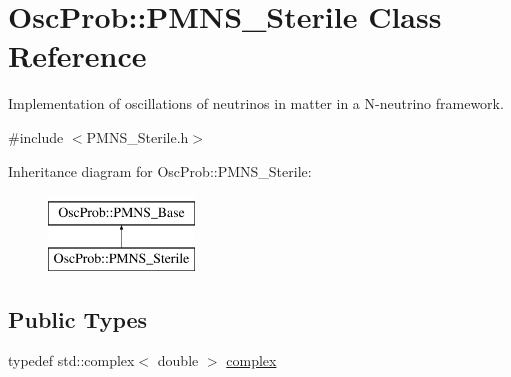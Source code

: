 \hypertarget{classOscProb_1_1PMNS__Sterile}{}\section{Osc\+Prob\+:\+:P\+M\+N\+S\+\_\+\+Sterile Class Reference}
\label{classOscProb_1_1PMNS__Sterile}


Implementation of oscillations of neutrinos in matter in a N-\/neutrino framework.  




{\ttfamily \#include $<$P\+M\+N\+S\+\_\+\+Sterile.\+h$>$}

Inheritance diagram for Osc\+Prob\+:\+:P\+M\+N\+S\+\_\+\+Sterile\+:\begin{figure}[H]
\begin{center}
\leavevmode
\includegraphics[height=2.000000cm]{classOscProb_1_1PMNS__Sterile}
\end{center}
\end{figure}
\subsection*{Public Types}
\begin{DoxyCompactItemize}
\item 
typedef std\+::complex$<$ double $>$ \hyperlink{classOscProb_1_1PMNS__Base_ae86ec4718808ce9d02e5f5b4226714ab}{complex}
\end{DoxyCompactItemize}
